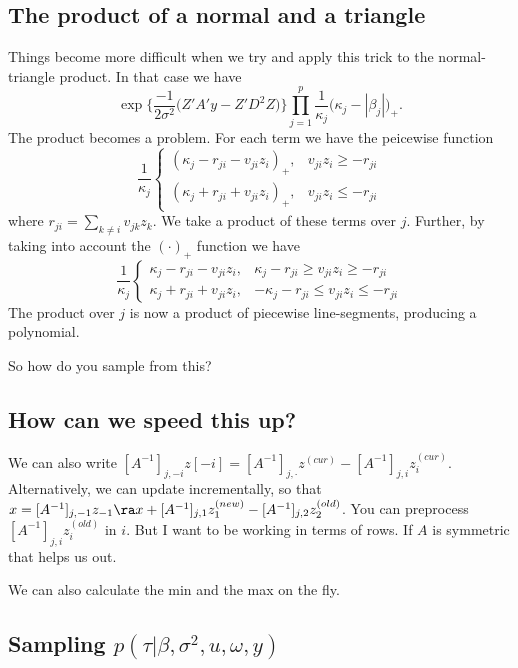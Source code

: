 \documentclass{article}
\begin{document}
\subsection*{The product of a normal and a triangle}

Things become more difficult when we try and apply this trick to the
normal-triangle product.  In that case we have
\[
\exp \Big\{ \frac{-1}{2 \sigma^2} \Big( Z' A'y - Z' D^2 Z \Big) \Big\} 
\prod_{j=1}^p \frac{1}{\kappa_j} \Big( \kappa_j - |\beta_j| \Big)_+.
\]
The product becomes a problem.  For each term we have the peicewise function
\[
\frac{1}{\kappa_j}
\begin{cases}
(\kappa_j - r_{ji} - v_{ji} z_i)_+, & v_{ji} z_i \geq - r_{ji} \\
(\kappa_j + r_{ji} + v_{ji} z_i)_+, & v_{ji} z_i \leq - r_{ji}
\end{cases}
\]
where $r_{ji} = \sum_{k \neq i} v_{jk} z_k$.  We take a product of these terms
over $j$.  Further, by taking into account the $(\cdot)_+$ function we have
\[
\frac{1}{\kappa_j}
\begin{cases}
\kappa_j - r_{ji} - v_{ji} z_i, & \kappa_j - r_{ji} \geq v_{ji} z_i \geq - r_{ji} \\
\kappa_j + r_{ji} + v_{ji} z_i, & -\kappa_j - r_{ji} \leq v_{ji} z_i \leq - r_{ji}
\end{cases}
\]
The product over $j$ is now a product of piecewise line-segments, producing a
polynomial.

So how do you sample from this?

\subsection{How can we speed this up?}

We can also write $[A^{-1}]_{j,-i} z[-i] = [A^{-1}]_{j,\cdot} z^{(cur)} -
[A^{-1}]_{j,i} z^{(cur)}_i$.  Alternatively, we can update incrementally, so
that $x = [A^{-1}]_{j,-1} z_{-1} \ra x + [A^{-1}]_{j,1} z_{1}^{(new)} -
[A^{-1}]_{j,2} z_{2}^{(old)}$.  You can preprocess $[A^{-1}]_{j,i} z_i^{(old)}$
in $i$.  But I want to be working in terms of rows.  If $A$ is symmetric that
helps us out.

We can also calculate the min and the max on the fly.

\subsection*{Sampling $p(\tau | \beta, \sigma^2, u, \omega, y)$}
\end{document}
